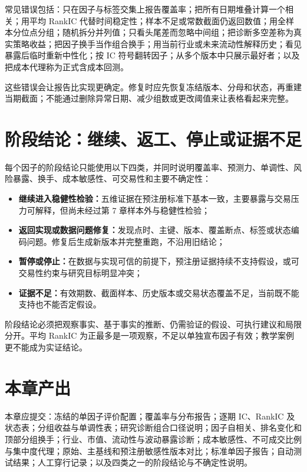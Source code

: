 \begin{warningbox}
常见错误包括：只在因子与标签交集上报告覆盖率；把所有日期堆叠计算一个相关；用平均 RankIC 代替时间稳定性；样本不足或常数截面仍返回数值；用全样本分位点分组；随机拆分并列值；只看头尾差而忽略中间组；把诊断多空差称为真实策略收益；把因子换手当作组合换手；用当前行业或未来流动性解释历史；看见暴露后临时重新中性化；按 IC 符号翻转因子；从多个版本中只展示最好者；以及把成本代理称为正式含成本回测。
\end{warningbox}

这些错误会让报告比实现更确定。修复时应先恢复冻结版本、分母和状态，再重建当期截面；不能通过删除异常日期、减少组数或更改阈值来让表格看起来完整。

\section{阶段结论：继续、返工、停止或证据不足}

每个因子的阶段结论只能使用以下四类，并同时说明覆盖率、预测力、单调性、风险暴露、换手、成本敏感性、可交易性和主要不确定性：

\begin{itemize}
  \item \textbf{继续进入稳健性检验：}五维证据在预注册标准下基本一致，主要暴露与交易压力可解释，但尚未经过第 7 章样本外与稳健性检验；
  \item \textbf{返回实现或数据问题修复：}发现点时、主键、版本、覆盖断点、标签或状态编码问题。修复后生成新版本并完整重跑，不沿用旧结论；
  \item \textbf{暂停或停止：}在数据与实现可信的前提下，预注册证据持续不支持假设，或可交易性约束与研究目标明显冲突；
  \item \textbf{证据不足：}有效期数、截面样本、历史版本或交易状态覆盖不足，当前既不能支持也不能否定假设。
\end{itemize}

\begin{principlebox}
阶段结论必须把观察事实、基于事实的推断、仍需验证的假设、可执行建议和局限分开。平均 RankIC 为正最多是一项观察，不足以单独宣布因子有效；教学案例更不能成为实证结论。
\end{principlebox}

\section{本章产出}

\begin{outputbox}
本章应提交：冻结的单因子评价配置；覆盖率与分布报告；逐期 IC、RankIC 及状态表；分组收益与单调性表；研究诊断组合口径说明；因子自相关、排名变化和顶部分组换手；行业、市值、流动性与波动暴露诊断；成本敏感性、不可成交比例与集中度代理；原始、主基线和预注册敏感性版本对比；标准单因子报告；自动测试结果；人工穿行记录；以及四类之一的阶段结论与不确定性说明。
\end{outputbox}

